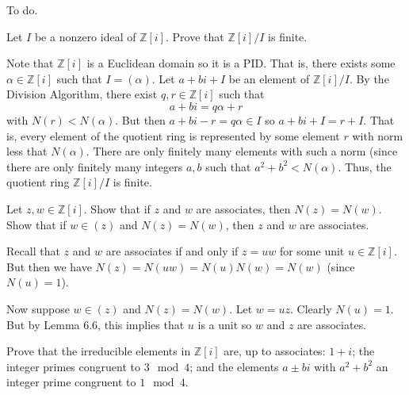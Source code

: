 \documentclass[../../master.tex]{subfiles}
\begin{document}
\begin{solution}
    To do.
\end{solution}

\begin{problem}
    Let $I$ be a nonzero ideal of $\mathbb{Z}[i]$. 
    Prove that $\mathbb{Z}[i] / I$ is finite.
\end{problem}

\begin{solution}
    Note that $\mathbb{Z}[i]$ is a Euclidean domain so it is a PID.
    That is, there exists some $\alpha \in \mathbb{Z}[i]$ such that $I = (\alpha)$.
    Let $a + bi + I$ be an element of $\mathbb{Z}[i] / I$.
    By the Division Algorithm, there exist $q, r \in \mathbb{Z}[i]$ such that
    \[
    a + bi = q\alpha + r
    \]
    with $N(r) < N(\alpha)$.
    But then $a + bi - r = q\alpha \in I$ so $a + bi + I = r + I$.
    That is, every element of the quotient ring is represented by some element $r$ with norm less that $N(\alpha)$.
    There are only finitely many elements with such a norm (since there are only finitely many integers $a, b$ such that $a^2 + b^2 < N(\alpha)$.
    Thus, the quotient ring $\mathbb{Z}[i] / I$ is finite.
\end{solution}

\begin{problem}
    Let $z, w \in \mathbb{Z}[i]$.
    Show that if $z$ and $w$ are associates, then $N(z) = N(w)$.
    Show that if $w \in (z)$ and $N(z) = N(w)$, then $z$ and $w$ are associates.
\end{problem}

\begin{solution}
    Recall that $z$ and $w$ are associates if and only if $z = uw$ for some unit $u \in \mathbb{Z}[i]$.
    But then we have $N(z) = N(uw) = N(u) N(w) = N(w)$ (since $N(u) = 1$).

    Now suppose $w \in (z)$ and $N(z) = N(w)$.
    Let $w = u z$. 
    Clearly $N(u) = 1$.
    But by Lemma 6.6, this implies that $u$ is a unit so $w$ and $z$ are associates.
\end{solution}

\begin{problem}
    Prove that the irreducible elements in $\mathbb{Z}[i]$ are, up to associates:
    $1 + i$;
    the integer primes congruent to $3 \mod 4$;
    and the elements $a \pm bi$ with $a^2 + b^2$ an integer prime congruent to $1 \mod 4$.
\end{problem}
\end{document}
